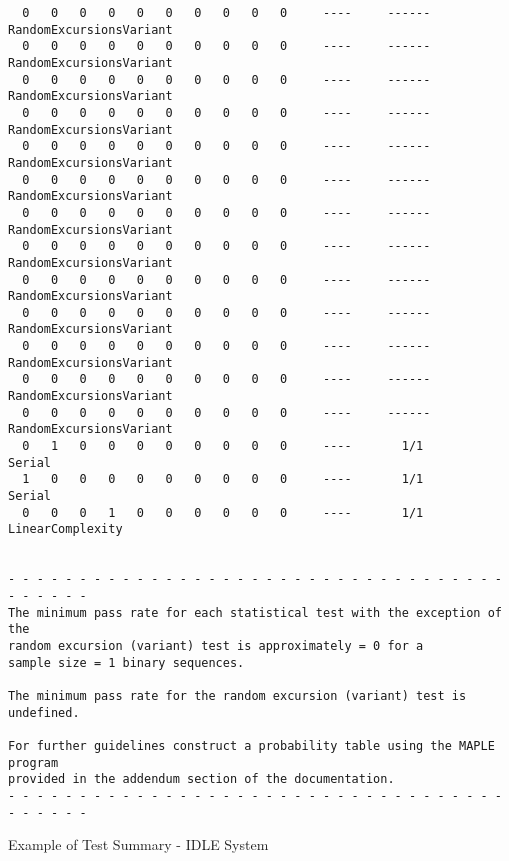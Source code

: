 \begin{code}
\begin{verbatim}
  0   0   0   0   0   0   0   0   0   0     ----     ------     RandomExcursionsVariant
  0   0   0   0   0   0   0   0   0   0     ----     ------     RandomExcursionsVariant
  0   0   0   0   0   0   0   0   0   0     ----     ------     RandomExcursionsVariant
  0   0   0   0   0   0   0   0   0   0     ----     ------     RandomExcursionsVariant
  0   0   0   0   0   0   0   0   0   0     ----     ------     RandomExcursionsVariant
  0   0   0   0   0   0   0   0   0   0     ----     ------     RandomExcursionsVariant
  0   0   0   0   0   0   0   0   0   0     ----     ------     RandomExcursionsVariant
  0   0   0   0   0   0   0   0   0   0     ----     ------     RandomExcursionsVariant
  0   0   0   0   0   0   0   0   0   0     ----     ------     RandomExcursionsVariant
  0   0   0   0   0   0   0   0   0   0     ----     ------     RandomExcursionsVariant
  0   0   0   0   0   0   0   0   0   0     ----     ------     RandomExcursionsVariant
  0   0   0   0   0   0   0   0   0   0     ----     ------     RandomExcursionsVariant
  0   0   0   0   0   0   0   0   0   0     ----     ------     RandomExcursionsVariant
  0   1   0   0   0   0   0   0   0   0     ----       1/1       Serial
  1   0   0   0   0   0   0   0   0   0     ----       1/1       Serial
  0   0   0   1   0   0   0   0   0   0     ----       1/1       LinearComplexity


- - - - - - - - - - - - - - - - - - - - - - - - - - - - - - - - - - - - - - - - -
The minimum pass rate for each statistical test with the exception of the
random excursion (variant) test is approximately = 0 for a
sample size = 1 binary sequences.

The minimum pass rate for the random excursion (variant) test is undefined.

For further guidelines construct a probability table using the MAPLE program
provided in the addendum section of the documentation.
- - - - - - - - - - - - - - - - - - - - - - - - - - - - - - - - - - - - - - - - -
    \end{verbatim}
    \caption{Example of Test Summary - IDLE System}
    \label{lst:samp_nist_sum}
\end{code}